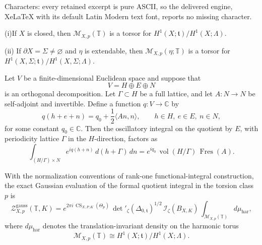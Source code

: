 \documentclass[10pt,a4paper]{amsart}
\begin{document}
Characters: every retained excerpt is pure ASCII, so the delivered engine, XeLaTeX with its default Latin Modern text font, reports no missing character.
\begin{prop}
\label{prop:moduli-torsor-toral}
(i)If \(X\) is closed, then  \(\mathcal M_{X,p}(\mathbb T)\) is a torsor for $H^1(X;\mathfrak t)/H^1(X;\Lambda).$

\noindent(ii) If \(\partial X=\Sigma\neq\varnothing\) and \(\eta\) is extendable, then \(\mathcal M_{X,p}(\eta;\mathbb T)\) is a torsor for \\
$H^1(X,\Sigma;\mathfrak t)/H^1(X,\Sigma;\Lambda).$
\end{prop}

\begin{prop}
\label{prop:linear-quotient-factorization}
Let \(V\) be a finite-dimensional Euclidean space and suppose that
\[
V=H\oplus E\oplus N
\]
is an orthogonal decomposition. Let \(\Gamma\subset H\) be a full lattice, and let
\(A\colon N\to N\) be self-adjoint and invertible. Define a function \(q\colon V\to \mathbb C\) by
\[
q(h+e+n)=q_0+\frac12\langle An,n\rangle,
\qquad
h\in H,\ e\in E,\ n\in N,
\]
for some constant \(q_0\in \mathbb C\). Then the oscillatory integral on the quotient by
\(E\), with periodicity lattice \(\Gamma\) in the \(H\)-direction, factors as
\[
\int_{(H/\Gamma)\times N} e^{iq(h+n)}\,d(h+\Gamma)\,dn
=
e^{iq_0}\,\operatorname{vol}(H/\Gamma)\,\operatorname{Fres}(A).
\]
\end{prop}

\begin{prop}
\label{prop:closed-gauge-reduction}
With the normalization conventions of  rank-one functional-integral construction,
the exact Gaussian evaluation of the formal quotient integral in the torsion class \(p\) is
\begin{equation}
\label{eq:closed-gauge-reduction}
\mathcal Z^{\mathrm{gauss}}_{X,p}(\mathbb T,K)
=
e^{2\pi i\,\operatorname{CS}_{X,P,K}(\Theta_p)}\,
\det\nolimits'_{\zeta}(\Delta_{0,\mathfrak t})^{1/2}\,
\mathcal I_\zeta(B_{X,K})\,
\int_{\mathcal M_{X,p}(\mathbb T)} d\mu_{\mathrm{har}},
\end{equation}
where \(d\mu_{\mathrm{har}}\) denotes the translation-invariant density on the harmonic torus
\[
\mathcal M_{X,p}(\mathbb T)
\cong
H^1(X;\mathfrak t)/H^1(X;\Lambda).
\]
\end{prop}
\end{document}
